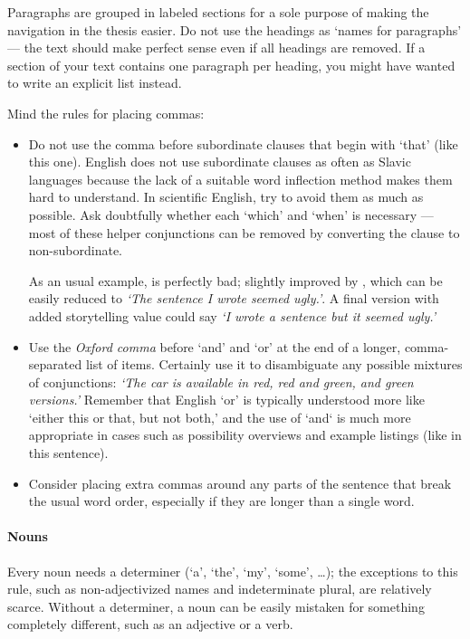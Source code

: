 Paragraphs are grouped in labeled sections for a sole purpose of making the navigation in the thesis easier. Do not use the headings as `names for paragraphs' --- the text should make perfect sense even if all headings are removed. If a section of your text contains one paragraph per heading, you might have wanted to write an explicit list instead.

Mind the rules for placing commas:
\begin{itemize}
\item Do not use the comma before subordinate clauses that begin with `that' (like this one). English does not use subordinate clauses as often as Slavic languages because the lack of a suitable word inflection method makes them hard to understand. In scientific English, try to avoid them as much as possible. Ask doubtfully whether each `which' and `when' is necessary --- most of these helper conjunctions can be removed by converting the clause to non-subordinate.

As an usual example,  is perfectly bad; slightly improved by , which can be easily reduced to \textit{`The sentence I wrote seemed ugly.'}. A final version with added storytelling value could say \textit{`I wrote a sentence but it seemed ugly.'}
\item Use the \emph{Oxford comma} before `and' and `or' at the end of a longer, comma-separated list of items. Certainly use it to disambiguate any possible mixtures of conjunctions: \textit{`The car is available in red, red and green, and green versions.'} Remember that English `or' is typically understood more like `either this or that, but not both,' and the use of `and` is much more appropriate in cases such as possibility overviews and example listings (like in this sentence).
\item Consider placing extra commas around any parts of the sentence that break the usual word order, especially if they are longer than a single word.
\end{itemize}

\paragraph{Nouns}
Every noun needs a determiner (`a', `the', `my', `some', \dots); the exceptions to this rule, such as non-adjectivized names and indeterminate plural, are relatively scarce. Without a determiner, a noun can be easily mistaken for something completely different, such as an adjective or a verb.

